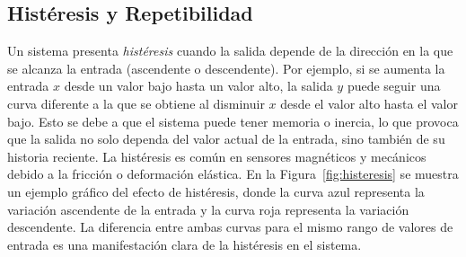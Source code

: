 

\subsection{Histéresis y Repetibilidad}\label{sec:histeresis_repetibilidad}

Un sistema presenta \emph{histéresis} cuando la salida depende de la dirección en la que se alcanza la entrada (ascendente o descendente). Por ejemplo, si se aumenta la entrada $x$ desde un valor bajo hasta un valor alto, la salida $y$ puede seguir una curva diferente a la que se obtiene al disminuir $x$ desde el valor alto hasta el valor bajo. Esto se debe a que el sistema puede tener memoria o inercia, lo que provoca que la salida no solo dependa del valor actual de la entrada, sino también de su historia reciente. La histéresis es común en sensores magnéticos y mecánicos debido a la fricción o deformación elástica. En la Figura~\ref{fig:histeresis} se muestra un ejemplo gráfico del efecto de histéresis, donde la curva azul representa la variación ascendente de la entrada y la curva roja representa la variación descendente. La diferencia entre ambas curvas para el mismo rango de valores de entrada es una manifestación clara de la histéresis en el sistema.

